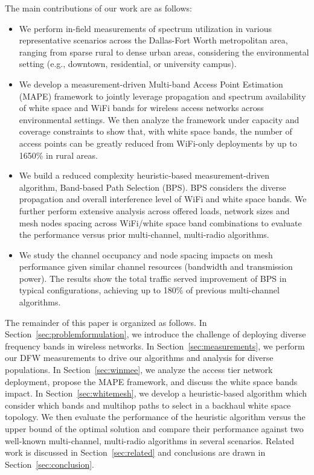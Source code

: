 The main contributions of our work are as follows:
\begin{itemize}
\item We perform in-field measurements of spectrum utilization in various representative
scenarios across the Dallas-Fort Worth metropolitan area, ranging from sparse rural to dense urban areas,  
considering the environmental setting (e.g., downtown, residential, or university campus).
\item We develop a measurement-driven Multi-band Access Point Estimation (MAPE) framework 
to jointly leverage propagation and spectrum availability of white space and WiFi bands 
for wireless access networks across environmental settings. We then analyze the framework under capacity and 
coverage constraints to show that, with white space bands, the number of access points 
can be greatly reduced from WiFi-only deployments by up to 1650\% in rural areas. 
\item We build a reduced complexity heuristic-based measurement-driven algorithm, Band-based 
Path Selection (BPS). BPS considers the diverse propagation and overall interference level 
of WiFi and white space bands. 
We further perform extensive analysis across offered loads,
network sizes and mesh nodes spacing across WiFi/white space band combinations to evaluate the 
performance versus prior multi-channel, multi-radio algorithms. 
\item We study the channel occupancy and node spacing impacts on mesh performance given similar 
channel resources (bandwidth and transmission power). The results show the total traffic served 
improvement of BPS in typical configurations, achieving up to 180\% of previous multi-channel algorithms.
\end{itemize}

The remainder of this paper is organized as follows. In Section~\ref{sec:problemformulation}, 
we introduce the challenge of deploying diverse frequency bands in wireless networks. 
In Section~\ref{sec:measurements}, we perform our DFW measurements to drive our algorithms and analysis
for diverse populations. 
In Section~\ref{sec:winmee}, we analyze the access tier network deployment, 
propose the MAPE framework, and discuss the white space bands impact. 
In Section~\ref{sec:whitemesh}, we develop a heuristic-based algorithm which consider which bands 
and multihop paths to select in a backhaul white space topology. We then evaluate the performance of 
the heuristic algorithm versus the upper bound of the optimal solution and 
compare their performance against two well-known multi-channel, multi-radio 
algorithms in several scenarios. Related work is discussed in Section~\ref{sec:related} and conclusions 
are drawn in Section~\ref{sec:conclusion}.

